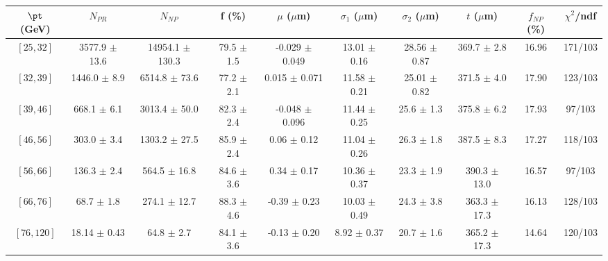 \begin{tabular}{c||c|c|c|c|c|c|c||c|c}
$\pt$ (GeV) & $N_{PR}$ & $N_{NP}$ & f (\%) & $\mu$ ($\mu$m) & $\sigma_1$ ($\mu$m) & $\sigma_2$ ($\mu$m)  & $t$ ($\mu$m) & $f_{NP}$ (\%) & $\chi^2$/ndf \\
\hline
$[25, 32]$ & 3577.9 $\pm$ 13.6 & 14954.1 $\pm$ 130.3 & 79.5 $\pm$ 1.5 & -0.029 $\pm$ 0.049 & 13.01 $\pm$ 0.16 & 28.56 $\pm$ 0.87 & 369.7 $\pm$ 2.8 & 16.96 & 171/103\\
$[32, 39]$ & 1446.0 $\pm$ 8.9 & 6514.8 $\pm$ 73.6 & 77.2 $\pm$ 2.1 & 0.015 $\pm$ 0.071 & 11.58 $\pm$ 0.21 & 25.01 $\pm$ 0.82 & 371.5 $\pm$ 4.0 & 17.90 & 123/103\\
$[39, 46]$ & 668.1 $\pm$ 6.1 & 3013.4 $\pm$ 50.0 & 82.3 $\pm$ 2.4 & -0.048 $\pm$ 0.096 & 11.44 $\pm$ 0.25 & 25.6 $\pm$ 1.3 & 375.8 $\pm$ 6.2 & 17.93 & 97/103\\
$[46, 56]$ & 303.0 $\pm$ 3.4 & 1303.2 $\pm$ 27.5 & 85.9 $\pm$ 2.4 & 0.06 $\pm$ 0.12 & 11.04 $\pm$ 0.26 & 26.3 $\pm$ 1.8 & 387.5 $\pm$ 8.3 & 17.27 & 118/103\\
$[56, 66]$ & 136.3 $\pm$ 2.4 & 564.5 $\pm$ 16.8 & 84.6 $\pm$ 3.6 & 0.34 $\pm$ 0.17 & 10.36 $\pm$ 0.37 & 23.3 $\pm$ 1.9 & 390.3 $\pm$ 13.0 & 16.57 & 97/103\\
$[66, 76]$ & 68.7 $\pm$ 1.8 & 274.1 $\pm$ 12.7 & 88.3 $\pm$ 4.6 & -0.39 $\pm$ 0.23 & 10.03 $\pm$ 0.49 & 24.3 $\pm$ 3.8 & 363.3 $\pm$ 17.3 & 16.13 & 128/103\\
$[76, 120]$ & 18.14 $\pm$ 0.43 & 64.8 $\pm$ 2.7 & 84.1 $\pm$ 3.6 & -0.13 $\pm$ 0.20 & 8.92 $\pm$ 0.37 & 20.7 $\pm$ 1.6 & 365.2 $\pm$ 17.3 & 14.64 & 120/103\\
\end{tabular}
